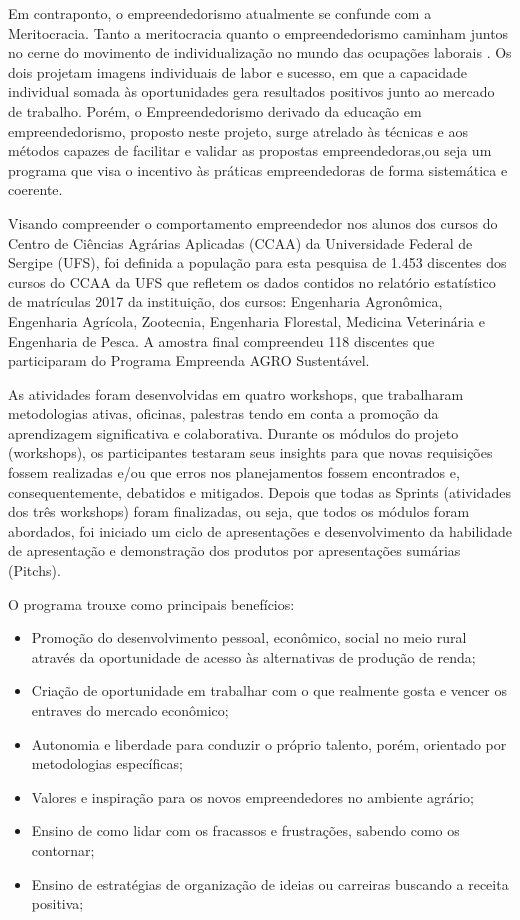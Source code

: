 Em contraponto, o empreendedorismo atualmente se confunde com a Meritocracia. Tanto a meritocracia quanto o empreendedorismo caminham juntos no cerne do movimento de individualização no mundo das ocupações laborais \cite{costa_novo_2019}. Os dois projetam imagens individuais de labor e sucesso, em que a capacidade individual somada às oportunidades gera resultados positivos junto ao mercado de trabalho. Porém, o Empreendedorismo derivado da educação em empreendedorismo, proposto neste projeto, surge atrelado às técnicas e aos métodos capazes de facilitar e validar as propostas empreendedoras,ou seja um programa que visa o incentivo às práticas empreendedoras de forma sistemática e coerente.

Visando compreender o comportamento empreendedor nos alunos dos cursos do Centro de Ciências Agrárias Aplicadas (CCAA) da Universidade Federal de Sergipe (UFS), foi definida a população para esta pesquisa de 1.453 discentes dos cursos do CCAA da UFS que refletem os dados contidos no relatório estatístico de matrículas 2017 da instituição, dos cursos: Engenharia Agronômica, Engenharia Agrícola, Zootecnia, Engenharia Florestal, Medicina Veterinária e Engenharia de Pesca. A amostra final compreendeu 118 discentes que participaram do Programa Empreenda AGRO Sustentável.

As atividades foram desenvolvidas em quatro workshops, que trabalharam metodologias ativas, oficinas, palestras tendo em conta a promoção da aprendizagem significativa e colaborativa. Durante os módulos do projeto (workshops), os participantes testaram seus insights para que novas requisições fossem realizadas e/ou que erros nos planejamentos fossem encontrados e, consequentemente, debatidos e mitigados. Depois que todas as Sprints (atividades dos três workshops) foram finalizadas, ou seja, que todos os módulos foram abordados, foi iniciado um ciclo de apresentações e desenvolvimento da habilidade de apresentação e demonstração dos produtos por apresentações sumárias (Pitchs). 

O programa trouxe como principais benefícios: 

\begin{itemize}
\item{Promoção do desenvolvimento pessoal, econômico, social no meio rural através da oportunidade de acesso às alternativas de produção de renda;}
\item{Criação de oportunidade em trabalhar com o que realmente gosta e vencer os entraves do mercado econômico;}
\item{Autonomia e liberdade para conduzir o próprio talento, porém, orientado por metodologias específicas;}
\item{Valores e inspiração para os novos empreendedores no ambiente agrário;}
\item{Ensino de como lidar com os fracassos e frustrações, sabendo como os contornar;}
\item{Ensino de estratégias de organização de ideias ou carreiras buscando a receita positiva;}
\end{itemize}



